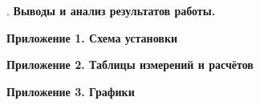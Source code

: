 \documentclass[12pt]{article}
\begin{document}
    \mediumvspace

    . \textbf{Выводы и анализ результатов работы.}

    

    \clearpage

    \begin{center}
        \LARGE
        \textbf{Приложение 1. Схема установки}
    \end{center}

    \mediumvspace

    

    \clearpage

    \begin{center}
        \LARGE
        \textbf{Приложение 2. Таблицы измерений и расчётов}
    \end{center}

    \mediumvspace

    


    \clearpage

    \begin{center}
        \LARGE
        \textbf{Приложение 3. Графики}
    \end{center}

    \mediumvspace

    
\end{document}
